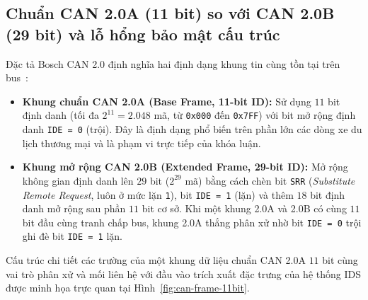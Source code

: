 \documentclass[12pt, a4paper, reqno, oneside]{book}
\DeclareRobustCommand{\code}[1]{\nolinkurl{#1}}
\begin{document}
\subsection{Chuẩn CAN 2.0A (11 bit) so với CAN 2.0B (29 bit) và lỗ hổng bảo mật cấu trúc}
Đặc tả Bosch CAN 2.0 định nghĩa hai định dạng khung tin cùng tồn tại trên bus~\cite{bosch1991can,iso11898_1_2015}:
\begin{itemize}
    \item \textbf{Khung chuẩn CAN 2.0A (Base Frame, 11-bit ID):} Sử dụng $11$ bit định danh (tối đa $2^{11} = 2.048$ mã, từ \texttt{0x000} đến \texttt{0x7FF}) với bit mở rộng định danh \code{IDE = 0} (trội). Đây là định dạng phổ biến trên phần lớn các dòng xe du lịch thương mại và là phạm vi trực tiếp của khóa luận.
    \item \textbf{Khung mở rộng CAN 2.0B (Extended Frame, 29-bit ID):} Mở rộng không gian định danh lên $29$ bit ($2^{29}$ mã) bằng cách chèn bit \code{SRR} (\textit{Substitute Remote Request}, luôn ở mức lặn \texttt{1}), bit \code{IDE = 1} (lặn) và thêm $18$ bit định danh mở rộng sau phần $11$ bit cơ sở. Khi một khung 2.0A và 2.0B có cùng $11$ bit đầu cùng tranh chấp bus, khung 2.0A thắng phân xử nhờ bit \code{IDE = 0} trội ghi đè bit \code{IDE = 1} lặn.
\end{itemize}

Cấu trúc chi tiết các trường của một khung dữ liệu chuẩn CAN 2.0A $11$ bit cùng vai trò phân xử và mối liên hệ với đầu vào trích xuất đặc trưng của hệ thống IDS được minh họa trực quan tại Hình~\ref{fig:can-frame-11bit}.
\end{document}
